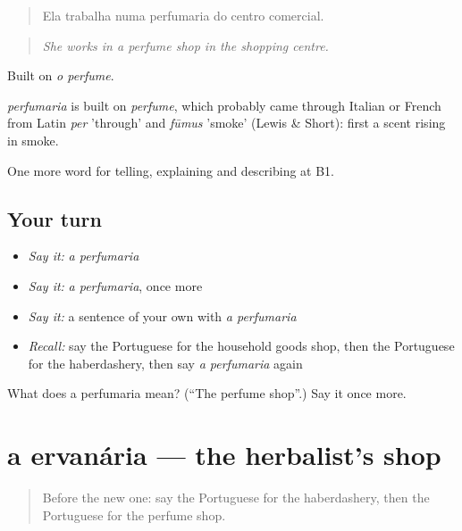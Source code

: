 \begin{quote}
Ela trabalha numa perfumaria do centro comercial.
\end{quote}

\begin{quote}
\emph{She works in a perfume shop in the shopping centre.}
\end{quote}

Built on \emph{o perfume}.

\begin{cousinweb}
\emph{perfumaria} is built on \emph{perfume}, which probably came through Italian or French from Latin \emph{per} 'through' and \emph{fūmus} 'smoke' (Lewis \& Short): first a scent rising in smoke.
\end{cousinweb}

\begin{grammarlens}[title={What you've built}]
One more word for telling, explaining and describing at B1.
\end{grammarlens}

\subsection*{Your turn}
\begin{itemize}
\raggedright
  \item \emph{Say it:} \emph{a perfumaria}
  \item \emph{Say it:} \emph{a perfumaria}, once more
  \item \emph{Say it:} a sentence of your own with \emph{a perfumaria}
  \item \emph{Recall:} say the Portuguese for the household goods shop, then the Portuguese for the haberdashery, then say \emph{a perfumaria} again
\end{itemize}

\begin{tcolorbox}[breakable,colback=teal!4,colframe=teal!35!black,title={Before you move on}]
What does a perfumaria mean? (\textquotedblleft{}The perfume shop\textquotedblright{}.) Say it once more.
\end{tcolorbox}
\section[a ervanária]{a ervanária — the herbalist's shop}

\label{lesson:PT-C449-ervanaria}



\begin{quote}
Before the new one: say the Portuguese for the haberdashery, then the Portuguese for the perfume shop.
\end{quote}

